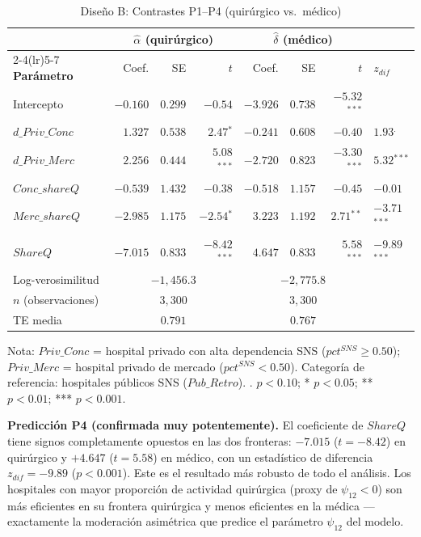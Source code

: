 \documentclass[12pt, a4paper]{article}
\newcommand{\sig}[1]{\ensuremath{^{#1}}}
\begin{document}
\begin{table}[h!]
\centering
\caption{Diseño B: Contrastes P1--P4
(quirúrgico vs.\ médico)}
\label{tab:disB}
\begin{threeparttable}
\begin{tabular}{lrrrrrrl}
\toprule
& \multicolumn{3}{c}{\textbf{$\hat{\alpha}$ (quirúrgico)}}
& \multicolumn{3}{c}{\textbf{$\hat{\delta}$ (médico)}}
& \\
\cmidrule(lr){2-4}\cmidrule(lr){5-7}
\textbf{Parámetro} & Coef. & SE & $t$
  & Coef. & SE & $t$ & \textbf{$z_{dif}$} \\
\midrule
Intercepto
  & $-0.160$ & $0.299$ & $-0.54$
  & $-3.926$ & $0.738$ & $-5.32$\sig{***} & \\
$d\_Priv\_Conc$
  & $1.327$  & $0.538$ & $2.47$\sig{*}
  & $-0.241$ & $0.608$ & $-0.40$
  & $1.93$\sig{.} \\
$d\_Priv\_Merc$
  & $2.256$  & $0.444$ & $5.08$\sig{***}
  & $-2.720$ & $0.823$ & $-3.30$\sig{***}
  & $5.32$\sig{***} \\
$Conc\_shareQ$
  & $-0.539$ & $1.432$ & $-0.38$
  & $-0.518$ & $1.157$ & $-0.45$
  & $-0.01$ \\
$Merc\_shareQ$
  & $-2.985$ & $1.175$ & $-2.54$\sig{*}
  & $3.223$  & $1.192$ & $2.71$\sig{**}
  & $-3.71$\sig{***} \\
$ShareQ$
  & $-7.015$ & $0.833$ & $-8.42$\sig{***}
  & $4.647$  & $0.833$ & $5.58$\sig{***}
  & $-9.89$\sig{***} \\
\midrule
Log-verosimilitud & \multicolumn{3}{c}{$-1{,}456.3$}
  & \multicolumn{3}{c}{$-2{,}775.8$} & \\
$n$ (observaciones) & \multicolumn{3}{c}{$3{,}300$}
  & \multicolumn{3}{c}{$3{,}300$} & \\
TE media & \multicolumn{3}{c}{$0.791$}
  & \multicolumn{3}{c}{$0.767$} & \\
\bottomrule
\end{tabular}
\begin{tablenotes}
  \small
  \item Nota: $Priv\_Conc$ = hospital privado con alta
    dependencia SNS ($pct^{SNS} \geq 0.50$);
    $Priv\_Merc$ = hospital privado de mercado
    ($pct^{SNS} < 0.50$). Categoría de referencia:
    hospitales públicos SNS ($Pub\_Retro$). . $p<0.10$;
    * $p<0.05$; ** $p<0.01$; *** $p<0.001$.
\end{tablenotes}
\end{threeparttable}
\end{table}

\textbf{Predicción P4 (confirmada muy potentemente).}
El coeficiente de $ShareQ$ tiene signos completamente
opuestos en las dos fronteras: $-7.015$ ($t=-8.42$)
en quirúrgico y $+4.647$ ($t=5.58$) en médico, con un
estadístico de diferencia $z_{dif}=-9.89$ ($p<0.001$).
Este es el resultado más robusto de todo el análisis.
Los hospitales con mayor proporción de actividad
quirúrgica (proxy de $\psi_{12} < 0$) son más eficientes
en su frontera quirúrgica y menos eficientes en la
médica --- exactamente la moderación asimétrica que
predice el parámetro $\psi_{12}$ del modelo.
\end{document}
